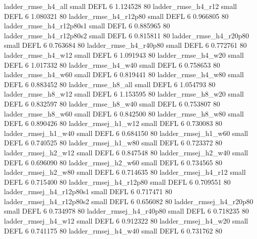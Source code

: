       ladder_rmse_h4_all      small     DEFL                 6 1.124528 80
      ladder_rmse_h4_r12      small     DEFL                 6 1.080321 80
   ladder_rmse_h4_r12p80      small     DEFL                 6 0.966805 80
 ladder_rmse_h4_r12p80s1      small     DEFL                 6 0.885965 80
 ladder_rmse_h4_r12p80s2      small     DEFL                 6 0.815811 80
   ladder_rmse_h4_r20p80      small     DEFL                 6 0.763684 80
   ladder_rmse_h4_r40p80      small     DEFL                 6 0.772761 80
      ladder_rmse_h4_w12      small     DEFL                 6 1.091943 80
      ladder_rmse_h4_w20      small     DEFL                 6 1.017332 80
      ladder_rmse_h4_w40      small     DEFL                 6 0.758653 80
      ladder_rmse_h4_w60      small     DEFL                 6 0.819441 80
      ladder_rmse_h4_w80      small     DEFL                 6 0.883452 80
      ladder_rmse_h8_all      small     DEFL                 6 1.054793 80
      ladder_rmse_h8_w12      small     DEFL                 6 1.153595 80
      ladder_rmse_h8_w20      small     DEFL                 6 0.832597 80
      ladder_rmse_h8_w40      small     DEFL                 6 0.753807 80
      ladder_rmse_h8_w60      small     DEFL                 6 0.842500 80
      ladder_rmse_h8_w80      small     DEFL                 6 0.890426 80
     ladder_rmsej_h1_w12      small     DEFL                 6 0.730083 80
     ladder_rmsej_h1_w40      small     DEFL                 6 0.684150 80
     ladder_rmsej_h1_w60      small     DEFL                 6 0.740525 80
     ladder_rmsej_h1_w80      small     DEFL                 6 0.723372 80
     ladder_rmsej_h2_w12      small     DEFL                 6 0.847548 80
     ladder_rmsej_h2_w40      small     DEFL                 6 0.696090 80
     ladder_rmsej_h2_w60      small     DEFL                 6 0.734565 80
     ladder_rmsej_h2_w80      small     DEFL                 6 0.714635 80
     ladder_rmsej_h4_r12      small     DEFL                 6 0.715400 80
  ladder_rmsej_h4_r12p80      small     DEFL                 6 0.709551 80
ladder_rmsej_h4_r12p80s1      small     DEFL                 6 0.717471 80
ladder_rmsej_h4_r12p80s2      small     DEFL                 6 0.656082 80
  ladder_rmsej_h4_r20p80      small     DEFL                 6 0.734978 80
  ladder_rmsej_h4_r40p80      small     DEFL                 6 0.718235 80
     ladder_rmsej_h4_w12      small     DEFL                 6 0.912322 80
     ladder_rmsej_h4_w20      small     DEFL                 6 0.741175 80
     ladder_rmsej_h4_w40      small     DEFL                 6 0.731762 80

